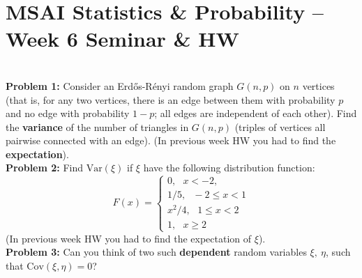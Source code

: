 \documentclass[12pt]{article}
\numberwithin{equation}{section}
\begin{document}
\section*{MSAI Statistics \& Probability – Week 6 Seminar \& HW}\\

\textbf{Problem 1:} Consider an Erd\H{o}s-R\'{e}nyi random graph $G(n,p)$ on $n$ vertices (that is, for any two vertices, there is an edge between them with probability $p$ and no edge with probability $1-p$; all edges are independent of each other). Find the \textbf{variance} of the number of triangles in $G(n,p)$ (triples of vertices all pairwise connected with an edge). (In previous week HW you had to find the \textbf{expectation}).
\\

\textbf{Problem 2:} Find $\textrm{Var}(\xi)$ if $\xi$ have the following distribution function:
$$F(x)=
\begin{cases}
0, ~~~ x<-2,\\
1/5, ~~~-2\leq x<1 \\
x^2/4, ~~~1\leq x<2 \\
1, ~~~ x\geq 2
\end{cases}$$
(In previous week HW you had to find the expectation of $\xi$).
\\

\textbf{Problem 3:} Can you think of two such \textbf{dependent} random variables $\xi,~\eta$, such that $\textrm{Cov}(\xi,\eta)=0$?
\end{document}
